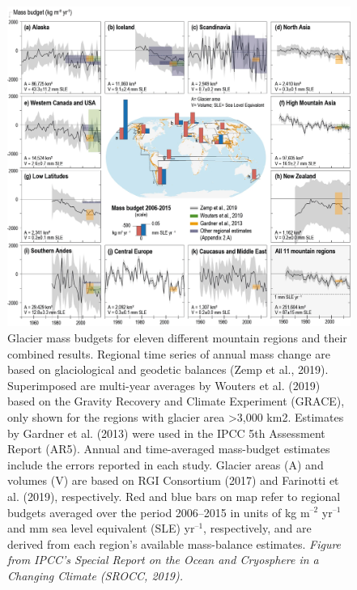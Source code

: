 \begin{figure}[h]
\centering
\includegraphics[width=14cm]{Figures/intro/Figure_1.png}
\caption{Glacier mass budgets for eleven different mountain regions and their combined results. Regional time series of annual mass change are based on glaciological and geodetic balances (Zemp et al., 2019). Superimposed are multi-year averages by Wouters et al. (2019) based on the Gravity Recovery and Climate Experiment (GRACE), only shown for the regions with glacier area >3,000 km2. Estimates by Gardner et al. (2013) were used in the IPCC 5th Assessment Report (AR5). Annual and time-averaged mass-budget estimates include the errors reported in each study. Glacier areas (A) and volumes (V) are based on RGI Consortium (2017)
and Farinotti et al. (2019), respectively. Red and blue bars on map refer to regional budgets averaged over the period 2006–2015 in units of kg m$^{–2}$ yr$^{–1}$ and mm sea level equivalent (SLE) yr$^{–1}$, respectively, and are derived from each region’s available mass-balance estimates. \textit{Figure from IPCC's Special Report on the Ocean and Cryosphere in a Changing Climate (SROCC, 2019).}} 
\label{intro:fig1}
\end{figure}

